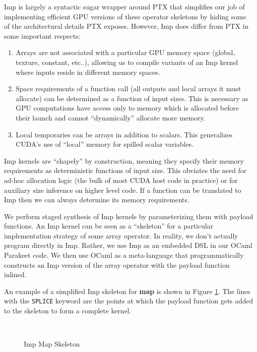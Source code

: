 \documentclass[preprint]{sigplanconf}
\begin{document}
Imp is largely a syntactic sugar wrapper around PTX that simplifies our job of implementing efficient GPU versions of these operator skeletons by hiding some of the architectural details PTX exposes. However, Imp does differ from PTX in some important respects:

\begin{enumerate}
\item  Arrays are not associated with a particular GPU memory space (global, texture, constant, etc..), allowing us to compile variants of an Imp kernel where inputs reside in different memory spaces.

\item Space requirements of a function call (all outputs and local arrays it must allocate) can be determined as a function of input sizes. This is necessary as GPU computations have access only to memory which is allocated before their launch and cannot ``dynamically'' allocate more memory.

\item Local temporaries can be arrays in addition to scalars. This generalizes CUDA's use of ``local'' memory for spilled scalar variables.
\end{enumerate}
Imp kernels are ``shapely'' by construction, meaning they specify their memory requirements as deterministic functions of input size. This obviates the need for ad-hoc allocation logic (the bulk of most CUDA host code in practice) or for auxiliary size inference on higher level code. If a function can be translated to Imp then we can always determine its memory requirements.

We perform staged synthesis of Imp kernels by parameterizing them with payload functions. An Imp kernel can be seen as a ``skeleton'' \cite{Cole04} for a particular implementation strategy of some array operator. In reality, we don't actually program directly in Imp.  Rather, we use Imp as an embedded DSL in our OCaml Parakeet code.  We then use OCaml as a meta-language that programmatically constructs an Imp version of the array operator with the payload function inlined.

An example of a simplified Imp skeleton for \textbf{map} is shown in Figure \ref{ImpMap}.  The lines with the \texttt{SPLICE} keyword are the points at which the payload function gets added to the skeleton to form a complete kernel.

\begin{figure}[h!]
  \begin{lstlisting}[numbers=none]
    
  \end{lstlisting}
  \caption{Imp Map Skeleton}
  \label{ImpMap}
\end{figure}
\end{document}
